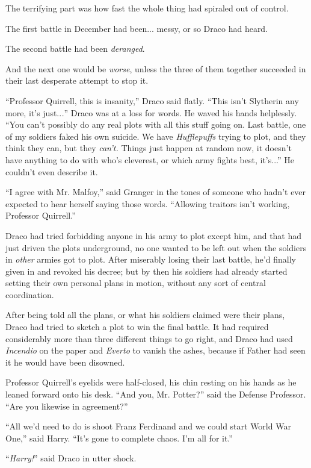 The terrifying part was how fast the whole thing had spiraled out of control.

The first battle in December had been... messy, or so Draco had heard.

The second battle had been \emph{deranged}.

And the next one would be \emph{worse}, unless the three of them together succeeded in their last desperate attempt to stop it.

``Professor Quirrell, this is insanity,'' Draco said flatly. ``This isn't Slytherin any more, it's just..\emph{.}'' Draco was at a loss for words. He waved his hands helplessly. ``You can't possibly do any real plots with all this stuff going on. Last battle, one of my soldiers faked his own suicide. We have \emph{Hufflepuffs} trying to plot, and they think they can, but they \emph{can't.} Things just happen at random now, it doesn't have anything to do with who's cleverest, or which army fights best, it's...'' He couldn't even describe it.

``I agree with Mr. Malfoy,'' said Granger in the tones of someone who hadn't ever expected to hear herself saying those words. ``Allowing traitors isn't working, Professor Quirrell.''

Draco had tried forbidding anyone in his army to plot except him, and that had just driven the plots underground, no one wanted to be left out when the soldiers in \emph{other} armies got to plot. After miserably losing their last battle, he'd finally given in and revoked his decree; but by then his soldiers had already started setting their own personal plans in motion, without any sort of central coordination.

After being told all the plans, or what his soldiers claimed were their plans, Draco had tried to sketch a plot to win the final battle. It had required considerably more than three different things to go right, and Draco had used \emph{Incendio} on the paper and \emph{Everto} to vanish the ashes, because if Father had seen it he would have been disowned.

Professor Quirrell's eyelids were half-closed, his chin resting on his hands as he leaned forward onto his desk. ``And you, Mr. Potter?'' said the Defense Professor. ``Are you likewise in agreement?''

``All we'd need to do is shoot Franz Ferdinand and we could start World War One,'' said Harry. ``It's gone to complete chaos. I'm all for it.''

``\emph{Harry!}'' said Draco in utter shock.

